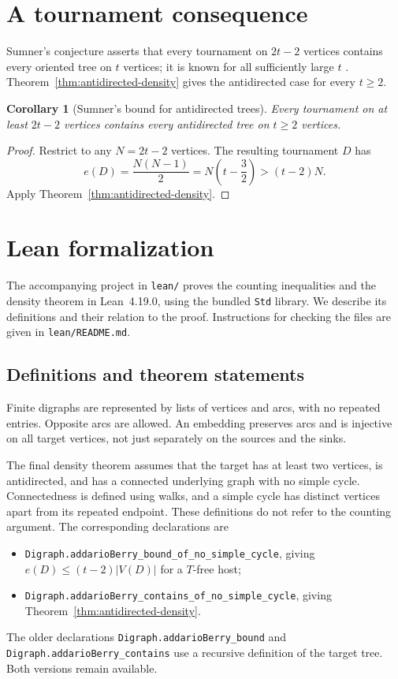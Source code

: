 \documentclass[11pt]{article}
\numberwithin{equation}{section}
\newtheorem{corollary}[theorem]{Corollary}
\theoremstyle{definition}
\begin{document}
\section{A tournament consequence}
\label{sec:tournaments}

Sumner's conjecture asserts that every tournament on $2t-2$ vertices
contains every oriented tree on $t$ vertices; it is known for all
sufficiently large $t$ \cite{KuhnMycroftOsthus2011,SteinSurvey2024}.
Theorem~\ref{thm:antidirected-density} gives the antidirected case
for every $t\geq2$.

\begin{corollary}[Sumner's bound for antidirected trees]
Every tournament on at least $2t-2$ vertices contains every antidirected
tree on $t\geq2$ vertices.
\end{corollary}

\begin{proof}
Restrict to any $N=2t-2$ vertices.  The resulting tournament $D$ has
\[
 e(D)=\frac{N(N-1)}2=N\left(t-\frac32\right)>(t-2)N.
\]
Apply Theorem~\ref{thm:antidirected-density}.
\end{proof}

\section{Lean formalization}
\label{sec:lean}

The accompanying project in \texttt{lean/} proves the counting
inequalities and the density theorem in Lean~4.19.0, using the bundled
\texttt{Std} library.  We describe its definitions and their relation
to the proof.  Instructions for checking the files are given in
\texttt{lean/README.md}.

\subsection{Definitions and theorem statements}

Finite digraphs are represented by lists of vertices and arcs, with no
repeated entries.  Opposite arcs are allowed.  An embedding preserves
arcs and is injective on all target vertices, not just separately on
the sources and the sinks.

The final density theorem assumes that the target has at least two
vertices, is antidirected, and has a connected underlying graph with
no simple cycle.  Connectedness is defined using walks, and a simple
cycle has distinct vertices apart from its repeated endpoint.
These definitions do not refer to the counting argument.
The corresponding declarations are
\begin{itemize}[leftmargin=*]
\item \texttt{Digraph.addarioBerry\_bound\_of\_no\_simple\_cycle},
      giving $e(D)\leq(t-2)|V(D)|$ for a $T$-free host;
\item \texttt{Digraph.addarioBerry\_contains\_of\_no\_simple\_cycle},
      giving Theorem~\ref{thm:antidirected-density}.
\end{itemize}
The older declarations \texttt{Digraph.addarioBerry\_bound} and
\texttt{Digraph.addarioBerry\_contains} use a recursive definition
of the target tree.  Both versions remain available.
\end{document}
